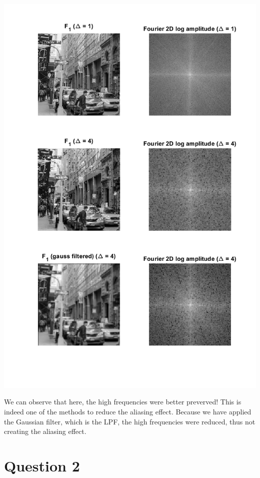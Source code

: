 \documentclass[a4paper]{iacas}
\begin{document}
\vskip 0.1in
\begin{minipage}{1\textwidth}
\centering
	\includegraphics[scale=0.7]{../imgs/q1_7.png}
\end{minipage}
\vskip 0.1in

We can observe that here, the high frequencies were better preverved! This is indeed one of the methods to reduce the aliasing effect. Because we have applied the Gaussian filter, which is the LPF, the high frequencies were reduced, thus not creating the aliasing effect. 




\newpage
\section{Question 2}
\end{document}
